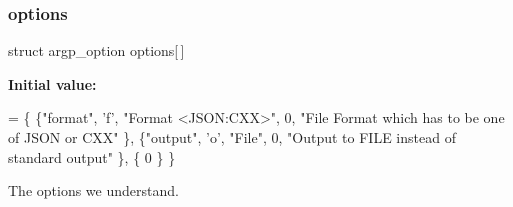 \subsubsection{\texorpdfstring{options}{options}}
{\footnotesize\ttfamily struct argp\+\_\+option options\mbox{[}$\,$\mbox{]}}

{\bfseries Initial value\+:}
\begin{DoxyCode}
=
\{
    \{\textcolor{stringliteral}{"format"}, \textcolor{charliteral}{'f'}, \textcolor{stringliteral}{"Format <JSON:CXX>"}, 0, \textcolor{stringliteral}{"File Format which has to be one of JSON or CXX"} \},
    \{\textcolor{stringliteral}{"output"}, \textcolor{charliteral}{'o'}, \textcolor{stringliteral}{"File"}, 0, \textcolor{stringliteral}{"Output to FILE instead of standard output"} \},
    \{ 0 \}
\}
\end{DoxyCode}


The options we understand. 

